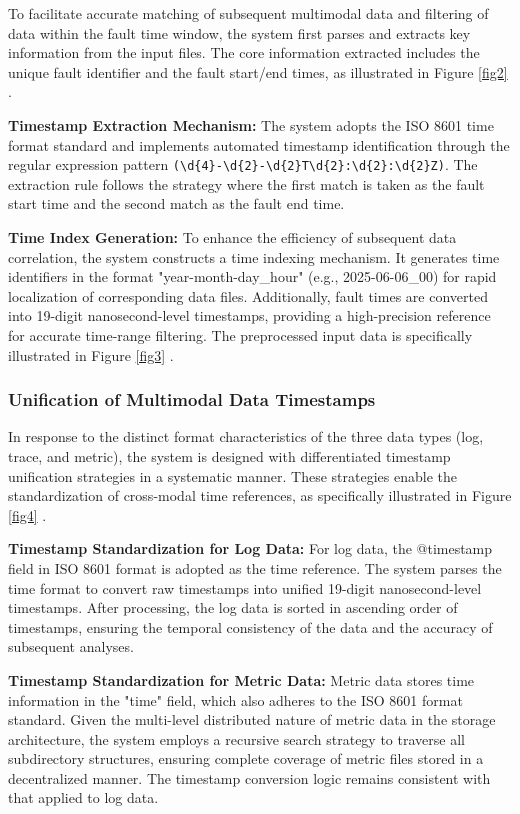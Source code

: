 \documentclass[10pt]{article}
\let\oldref\ref
\renewcommand{\ref}[1]{%
    \textcolor{blue}{\oldref{#1}}%
}
\begin{document}
To facilitate accurate matching of subsequent multimodal data and filtering of data within the fault time window, the system first parses and extracts key information from the input files. The core information extracted includes the unique fault identifier and the fault start/end times, as illustrated in Figure \ref{fig2}.

\textbf{Timestamp Extraction Mechanism:} The system adopts the ISO 8601 time format standard and implements automated timestamp identification through the regular expression pattern \verb!(\d{4}-\d{2}-\d{2}T\d{2}:\d{2}:\d{2}Z)!. The extraction rule follows the strategy where the first match is taken as the fault start time and the second match as the fault end time.

\textbf{Time Index Generation:} To enhance the efficiency of subsequent data correlation, the system constructs a time indexing mechanism. It generates time identifiers in the format "year-month-day\_hour" (e.g., 2025-06-06\_00) for rapid localization of corresponding data files. Additionally, fault times are converted into 19-digit nanosecond-level timestamps, providing a high-precision reference for accurate time-range filtering. The preprocessed input data is specifically illustrated in Figure \ref{fig3}.

\subsubsection{Unification of Multimodal Data Timestamps}

In response to the distinct format characteristics of the three data types (log, trace, and metric), the system is designed with differentiated timestamp unification strategies in a systematic manner. These strategies enable the standardization of cross-modal time references, as specifically illustrated in Figure \ref{fig4}.

\textbf{Timestamp Standardization for Log Data:} For log data, the @timestamp field in ISO 8601 format is adopted as the time reference. The system parses the time format to convert raw timestamps into unified 19-digit nanosecond-level timestamps. After processing, the log data is sorted in ascending order of timestamps, ensuring the temporal consistency of the data and the accuracy of subsequent analyses.

\textbf{Timestamp Standardization for Metric Data:} Metric data stores time information in the "time" field, which also adheres to the ISO 8601 format standard. Given the multi-level distributed nature of metric data in the storage architecture, the system employs a recursive search strategy to traverse all subdirectory structures, ensuring complete coverage of metric files stored in a decentralized manner. The timestamp conversion logic remains consistent with that applied to log data.
\end{document}
